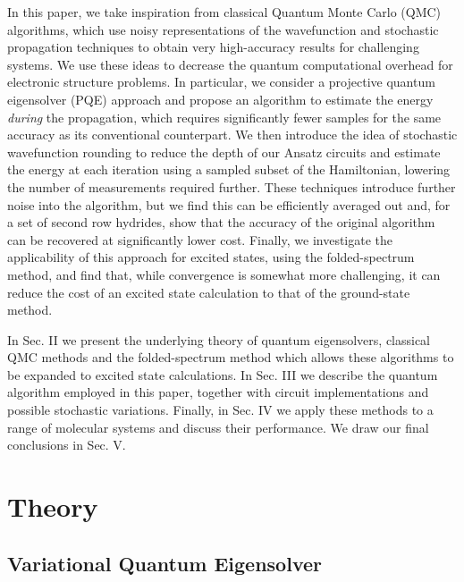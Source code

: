 \documentclass[%
 reprint,
 amsmath,amssymb,
 aps,
]{revtex4-2}
\begin{document}
In this paper, we take inspiration from classical Quantum Monte Carlo (QMC) algorithms,\cite{Booth2009, Thom2010, Filip2020} which use noisy representations of the wavefunction and stochastic propagation techniques to obtain very high-accuracy results for challenging systems. We use these ideas to decrease the quantum computational overhead for electronic structure problems. In particular, we consider a projective quantum eigensolver (PQE)\cite{Stair2021} approach and propose an algorithm to estimate the energy \textit{during} the propagation, which requires significantly fewer samples for the same accuracy as its conventional counterpart. We then introduce the idea of stochastic wavefunction rounding to reduce the depth of our Ansatz circuits and estimate the energy at each iteration using a sampled subset of the Hamiltonian, lowering the number of measurements required further. These techniques introduce further noise into the algorithm, but we find this can be efficiently averaged out and, for a set of second row hydrides, show that the accuracy of the original algorithm can be recovered at significantly lower cost. Finally, we investigate the applicability of this approach for excited states, using the folded-spectrum method, \cite{Peruzzo2014,Cao2019,CadiTazi2023} and find that, while convergence is somewhat more challenging, it can reduce the cost of an excited state calculation to that of the ground-state method.

In Sec. II we present the underlying theory of quantum eigensolvers, classical QMC methods and the folded-spectrum method which allows these algorithms to be expanded to excited state calculations. In Sec. III we describe the quantum algorithm employed in this paper, together with circuit implementations and possible stochastic variations. Finally, in Sec. IV we apply these methods to a range of molecular systems and discuss their performance. We draw our final conclusions in Sec. V.

\section{Theory}

\subsection{Variational Quantum Eigensolver}
\end{document}

